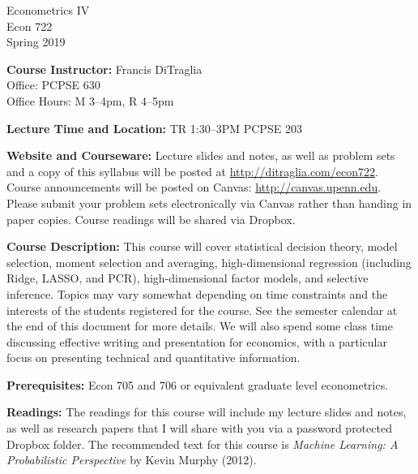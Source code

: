 \documentclass[11pt, letterpaper]{article}
\begin{document}
\thispagestyle{plain}

\begin{center}
\Large
\sc
Econometrics IV\\
\large
Econ 722\\
\large
Spring 2019
\end{center}



\normalsize

\noindent \textbf{Course Instructor:} Francis DiTraglia \\
Office: PCPSE 630\\
Office Hours: M 3--4pm, R 4--5pm 

\medskip

 
\noindent \textbf{Lecture Time and Location:} 
TR 1:30--3PM PCPSE 203

\medskip
 
\noindent \textbf{Website and Courseware:} Lecture slides and notes, as well as problem sets and a copy of this syllabus will be posted at \url{http://ditraglia.com/econ722}.
Course announcements will be posted on Canvas: \url{http://canvas.upenn.edu}.
Please submit your problem sets electronically via Canvas rather than handing in paper copies.
Course readings will be shared via Dropbox.

\medskip



\noindent \textbf{Course Description:} 
This course will cover statistical decision theory, model selection, moment selection and averaging, high-dimensional regression (including Ridge, LASSO, and PCR), high-dimensional factor models, and selective inference.
Topics may vary somewhat depending on time constraints and the interests of the students registered for the course.
See the semester calendar at the end of this document for more details.
We will also spend some class time discussing effective writing and presentation for economics, with a particular focus on presenting technical and quantitative information.

\medskip

\noindent \textbf{Prerequisites:} 
Econ 705 and 706 or equivalent graduate level econometrics. 



\medskip

\noindent \textbf{Readings:} 
The readings for this course will include my lecture slides and notes, as well as research papers that I will share with you via a password protected Dropbox folder.
The recommended text for this course is \emph{Machine Learning: A Probabilistic Perspective} by Kevin Murphy (2012).
\end{document}
